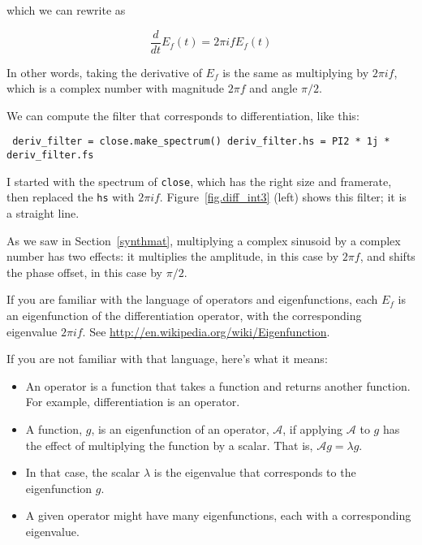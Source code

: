\documentclass[12pt]{book} \usepackage[width=5.5in,height=8.5in, hmarginratio=3:2,vmarginratio=1:1]{geometry}
\begin{document}
%
which we can rewrite as 

%
\[ \frac{d}{dt} E_f(t) = 2 \pi i f E_f(t) \] 

%
In other words, taking the derivative of $E_f$ is the same as multiplying by $2 \pi i f$, which is a complex number with magnitude $2 \pi f$ and angle $\pi/2$. 

We can compute the filter that corresponds to differentiation, like this: 

\begin{verbatim} deriv_filter = close.make_spectrum() deriv_filter.hs = PI2 * 1j * deriv_filter.fs \end{verbatim} 

I started with the spectrum of {\tt close}, which has the right size and framerate, then replaced the {\tt hs} with $2 \pi i f$. Figure~\ref{fig.diff_int3} (left) shows this filter; it is a straight line. 

As we saw in Section~\ref{synthmat}, multiplying a complex sinusoid by a complex number has two effects: it multiplies the amplitude, in this case by $2 \pi f$, and shifts the phase offset, in this case by $\pi/2$. 

If you are familiar with the language of operators and eigenfunctions, each $E_f$ is an eigenfunction of the differentiation operator, with the corresponding eigenvalue $2 \pi i f$. See \url{http://en.wikipedia.org/wiki/Eigenfunction}. 

If you are not familiar with that language, here's what it means: 

\newcommand{\op}{\mathcal{A}} 

\begin{itemize} 

\item An operator is a function that takes a function and returns another function. For example, differentiation is an operator. 

\item A function, $g$, is an eigenfunction of an operator, $\op$, if applying $\op$ to $g$ has the effect of multiplying the function by a scalar. That is, $\op g = \lambda g$. 

\item In that case, the scalar $\lambda$ is the eigenvalue that corresponds to the eigenfunction $g$. 

\item A given operator might have many eigenfunctions, each with a corresponding eigenvalue. 

\end{itemize} 
\end{document}
